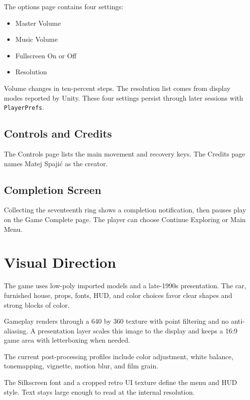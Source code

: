 \documentclass[11pt,a4paper]{article}
\begin{document}
The options page contains four settings:

\begin{itemize}
\item
  Master Volume
\item
  Music Volume
\item
  Fullscreen On or Off
\item
  Resolution
\end{itemize}

Volume changes in ten-percent steps. The resolution list comes from display modes reported by Unity. These four settings persist through later sessions with \texttt{PlayerPrefs}.

\subsection{Controls and Credits}\label{controls-and-credits}

The Controls page lists the main movement and recovery keys. The Credits page names Matej Spaji\'c as the creator.

\subsection{Completion Screen}\label{completion-screen}

Collecting the seventeenth ring shows a completion notification, then pauses play on the Game Complete page. The player can choose Continue Exploring or Main Menu.

\section{Visual Direction}\label{visual-direction}

The game uses low-poly imported models and a late-1990s presentation. The car, furnished house, props, fonts, HUD, and color choices favor clear shapes and strong blocks of color.

Gameplay renders through a 640 by 360 texture with point filtering and no anti-aliasing. A presentation layer scales this image to the display and keeps a 16:9 game area with letterboxing when needed.

The current post-processing profiles include color adjustment, white balance, tonemapping, vignette, motion blur, and film grain.

The Silkscreen font and a cropped retro UI texture define the menu and HUD style. Text stays large enough to read at the internal resolution.
\end{document}
